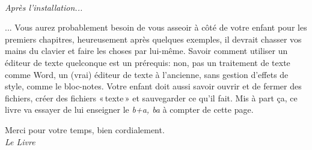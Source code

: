 \\


\textit{Après l'installation...}


... Vous aurez probablement besoin de vous asseoir à côté de votre enfant pour les premiers chapitres, heureusement après quelques exemples, il devrait chasser vos mains du clavier et faire les choses par lui-même. 
Savoir comment utiliser un éditeur de texte quelconque est un prérequis: non, pas un traitement de texte comme Word, un (vrai) éditeur de texte à l'ancienne, sans gestion d'effets de style, comme le bloc-notes. Votre enfant doit aussi savoir ouvrir et de fermer des fichiers, créer des fichiers « texte » et sauvegarder ce qu'il fait. Mis à part ça, ce livre va essayer de lui enseigner le \textit{b+a, ba} à compter de cette page.

\bigskip
Merci pour votre temps, bien cordialement.\\


\textit{Le Livre}

